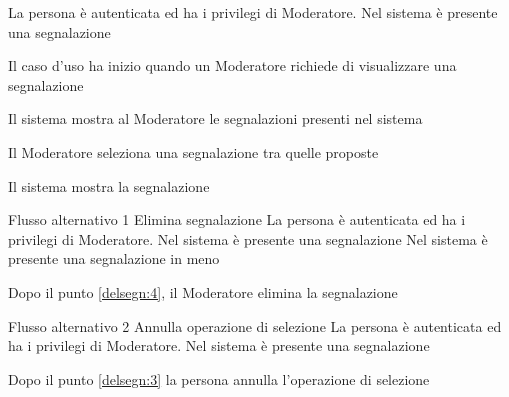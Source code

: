 {}
{La persona è autenticata ed ha i privilegi di Moderatore. Nel sistema è presente una segnalazione}
{\postNulle}
{\begin{enumCU}
	\item Il caso d'uso ha inizio quando un Moderatore richiede di visualizzare una segnalazione
	\item Il sistema mostra al Moderatore le segnalazioni presenti nel sistema\label{delsegn:3}
	\item Il Moderatore seleziona una segnalazione tra quelle proposte
	\item Il sistema mostra la segnalazione \label{delsegn:4}
\end{enumCU}}
%
{Flusso alternativo 1}%
{Elimina segnalazione}%
{La persona è autenticata ed ha i privilegi di Moderatore. Nel sistema è presente una segnalazione}
{Nel sistema è presente una segnalazione in meno}%
{\begin{enumCU}
		\item Dopo il punto \ref{delsegn:4}, il Moderatore elimina la segnalazione
\end{enumCU}}%
%	
{Flusso alternativo 2}%
{Annulla operazione di selezione}%
{La persona è autenticata ed ha i privilegi di Moderatore. Nel sistema è presente una segnalazione}%
{\postNulle}%
{\begin{enumCU}
		\item Dopo il punto \ref{delsegn:3} la persona annulla l'operazione di selezione
\end{enumCU}}%

\tabcuvspace

